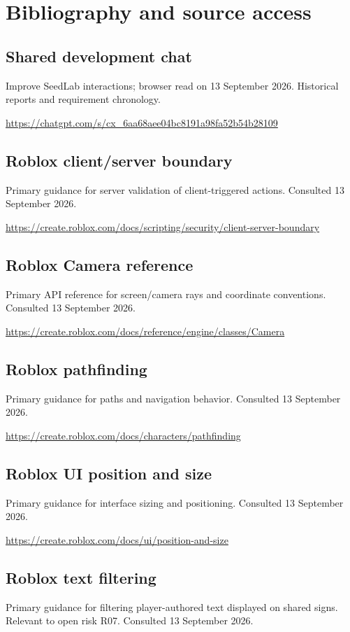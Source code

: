 \chapter{Bibliography and source access}
\section{Shared development chat}
Improve SeedLab interactions; browser read on 13 September 2026.\allowbreak{} Historical reports and requirement chronology.\allowbreak{}

\url{https://chatgpt.com/s/cx_6aa68aee04bc8191a98fa52b54b28109}

\section{Roblox client/\allowbreak{}server boundary}
Primary guidance for server validation of client-triggered actions.\allowbreak{} Consulted 13 September 2026.\allowbreak{}

\url{https://create.roblox.com/docs/scripting/security/client-server-boundary}

\section{Roblox Camera reference}
Primary API reference for screen/\allowbreak{}camera rays and coordinate conventions.\allowbreak{} Consulted 13 September 2026.\allowbreak{}

\url{https://create.roblox.com/docs/reference/engine/classes/Camera}

\section{Roblox pathfinding}
Primary guidance for paths and navigation behavior.\allowbreak{} Consulted 13 September 2026.\allowbreak{}

\url{https://create.roblox.com/docs/characters/pathfinding}

\section{Roblox UI position and size}
Primary guidance for interface sizing and positioning.\allowbreak{} Consulted 13 September 2026.\allowbreak{}

\url{https://create.roblox.com/docs/ui/position-and-size}

\section{Roblox text filtering}
Primary guidance for filtering player-authored text displayed on shared signs.\allowbreak{} Relevant to open risk R07.\allowbreak{} Consulted 13 September 2026.\allowbreak{}


